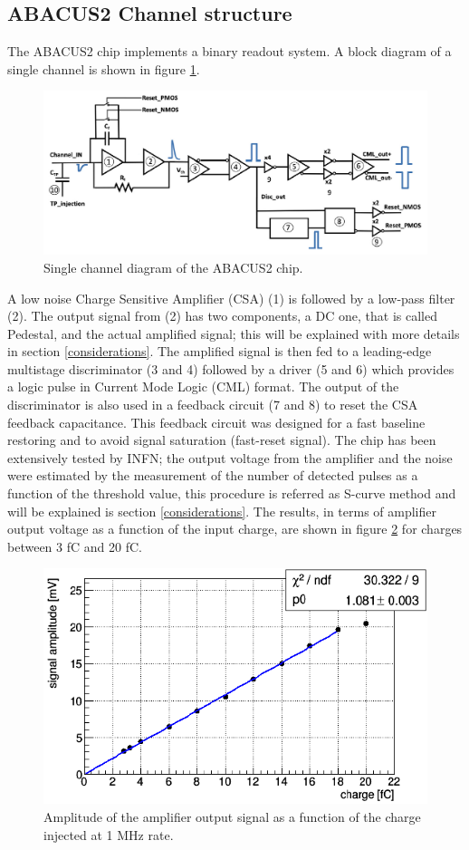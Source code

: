 \subsection{ABACUS2 Channel structure}
The ABACUS2 chip implements a binary readout system.
A block diagram of a single channel is shown in figure \ref{fig:abacuschannel}.
\begin{figure}[H]
	\centering
	\includegraphics[width=0.8\linewidth]{IMG/ch2/Abacus_channel.png}
	\caption{Single channel diagram of the ABACUS2 chip.}
	\label{fig:abacuschannel}
\end{figure}
\noindent A low noise Charge Sensitive Amplifier (CSA) (1) is followed by a low-pass filter (2).
The output signal from (2) has two components, a DC one, that is called Pedestal, and the actual amplified signal; this will be explained with more details in section \ref{considerations}.
The amplified signal is then fed to a leading-edge multistage discriminator (3 and 4) followed by a driver (5 and 6) which provides a logic pulse in Current Mode Logic (CML) format.
The output of the discriminator is also used in a feedback circuit (7 and 8) to reset the CSA feedback capacitance.
This feedback circuit was designed for a fast baseline restoring and to avoid signal saturation (fast-reset signal).
The chip has been extensively tested by INFN; the output voltage from the amplifier and the noise were estimated by the measurement of the number of detected pulses as a function of the threshold value, this procedure is referred as S-curve method and will be explained is section \ref{considerations}.
The results, in terms of amplifier output voltage as a function of the input charge, are shown in figure \ref{fig:abacustest} for charges between 3 fC and 20 fC\cite{abacus}.
\begin{figure}[H]
	\centering
	\includegraphics[width=0.7\linewidth]{IMG/ch2/ABACUSTEST}
	\caption{Amplitude of the amplifier output signal as a function of the charge injected at 1 MHz rate.}
	\label{fig:abacustest}
\end{figure}
